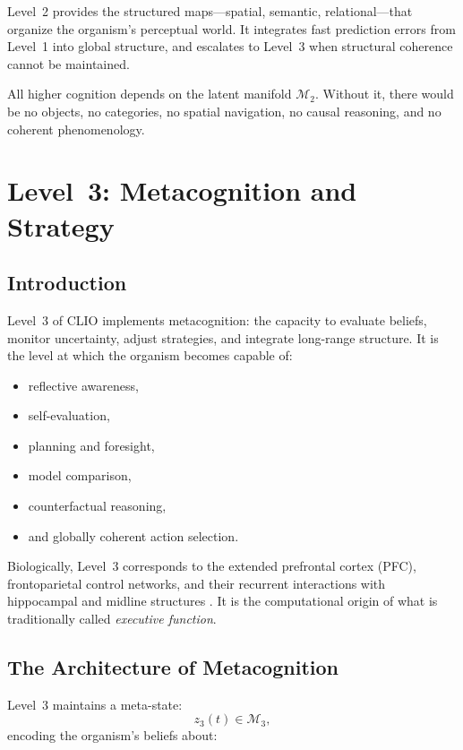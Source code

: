 \documentclass[12pt,oneside]{book}
\theoremstyle{plain}
\theoremstyle{definition}
\let\citep\parencite
\begin{document}
Level~2 provides the structured maps—spatial, semantic, relational—that
organize the organism’s perceptual world.
It integrates fast prediction errors from Level~1 into global structure,
and escalates to Level~3 when structural coherence cannot be maintained.

All higher cognition depends on the latent manifold $\mathcal{M}_2$.
Without it, there would be no objects, no categories, no spatial
navigation, no causal reasoning, and no coherent phenomenology.

\chapter{Level~3: Metacognition and Strategy}

\section{Introduction}

Level~3 of CLIO implements metacognition: the capacity to evaluate beliefs,
monitor uncertainty, adjust strategies, and integrate long-range structure.
It is the level at which the organism becomes capable of:

\begin{itemize}
  \item reflective awareness,
  \item self-evaluation,
  \item planning and foresight,
  \item model comparison,
  \item counterfactual reasoning,
  \item and globally coherent action selection.
\end{itemize}

Biologically, Level~3 corresponds to the extended prefrontal cortex (PFC),
frontoparietal control networks, and their recurrent interactions with
hippocampal and midline structures \citep{miller2001integrative,dehaene2005conscious}.
It is the computational origin of what is traditionally called
\emph{executive function}.

\section{The Architecture of Metacognition}

Level~3 maintains a meta-state:
\[
z_3(t)
\in \mathcal{M}_3,
\]
encoding the organism’s beliefs about:
\end{document}
